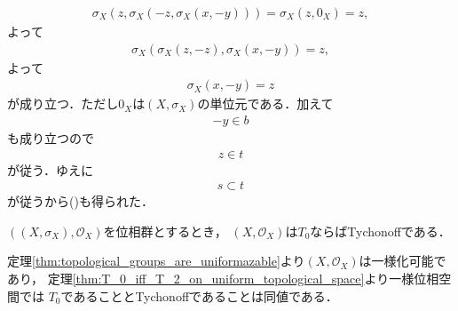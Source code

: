 \begin{sketch}
\begin{align}
			\sigma_X\left(z,\sigma_X\left(-z,\sigma_X\left(x,-y\right)\right)\right) = \sigma_X\left(z,0_X\right) = z,
		\end{align}
		よって
		\begin{align}
			\sigma_X\left(\sigma_X\left(z,-z\right),\sigma_X\left(x,-y\right)\right) = z,
		\end{align}
		よって
		\begin{align}
			\sigma_X\left(x,-y\right) = z
		\end{align}
		が成り立つ．ただし$0_X$は$\left(X,\sigma_X\right)$の単位元である．加えて
		\begin{align}
			-y \in b
		\end{align}
		も成り立つので
		\begin{align}
			z \in t
		\end{align}
		が従う．ゆえに
		\begin{align}
			s \subset t
		\end{align}
		が従うから()も得られた．
		\QED
	\end{sketch}
	
	\begin{screen}
		\begin{thm}
			$\left(\left(X,\sigma_X\right),\mathscr{O}_X\right)$を位相群とするとき，
			$\left(X,\mathscr{O}_X\right)$は$T_0$ならばTychonoffである．
		\end{thm}
	\end{screen}
	
	\begin{sketch}
		定理\ref{thm:topological_groups_are_uniformazable}より$\left(X,\mathscr{O}_X\right)$は一様化可能であり，
		定理\ref{thm:T_0_iff_T_2_on_uniform_topological_space}より一様位相空間では
		$T_0$であることとTychonoffであることは同値である．
		\QED
	\end{sketch}